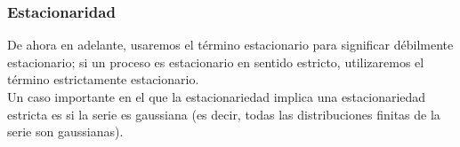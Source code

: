 \documentclass[xcolor=(list of options)]{beamer}
\begin{document}
\begin{frame}
\frametitle{Estacionaridad}

De ahora en adelante, usaremos el t\'ermino estacionario para significar d\'ebilmente estacionario; si un proceso es estacionario en sentido estricto, utilizaremos el t\'ermino estrictamente estacionario.\\
Un caso importante en el que la estacionariedad implica una estacionariedad estricta es si la serie es gaussiana (es decir, todas las distribuciones finitas de la serie son gaussianas). 

\end{frame}
\end{document}
